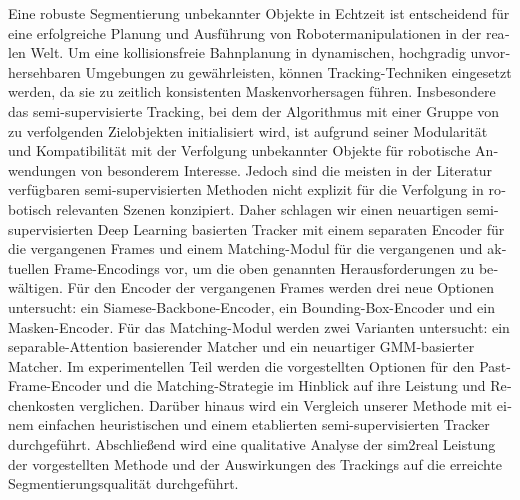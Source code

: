 \begin{otherlanguage}{ngerman} %
Eine robuste Segmentierung unbekannter Objekte in Echtzeit ist entscheidend für eine erfolgreiche Planung und Ausführung von Robotermanipulationen in der realen Welt. 
Um eine kollisionsfreie Bahnplanung in dynamischen, hochgradig unvorhersehbaren Umgebungen zu gewährleisten, können Tracking-Techniken eingesetzt werden, da sie zu zeitlich konsistenten Maskenvorhersagen führen.
Insbesondere das semi-supervisierte Tracking, bei dem der Algorithmus mit einer Gruppe von zu verfolgenden Zielobjekten initialisiert wird, ist aufgrund seiner Modularität und Kompatibilität mit der Verfolgung unbekannter Objekte für robotische Anwendungen von besonderem Interesse. 
Jedoch sind die meisten in der Literatur verfügbaren semi-supervisierten Methoden nicht explizit für die Verfolgung in robotisch relevanten Szenen konzipiert.  
Daher schlagen wir einen neuartigen semi-supervisierten Deep Learning basierten Tracker mit einem separaten Encoder für die vergangenen Frames und einem Matching-Modul für die vergangenen und aktuellen Frame-Encodings vor, um die oben genannten Herausforderungen zu bewältigen. 
Für den Encoder der vergangenen Frames werden drei neue Optionen untersucht: ein Siamese-Backbone-Encoder, ein Bounding-Box-Encoder und ein Masken-Encoder. 
Für das Matching-Modul werden zwei Varianten untersucht: ein separable-Attention basierender Matcher und ein neuartiger GMM-basierter Matcher. 
Im experimentellen Teil werden die vorgestellten Optionen für den Past-Frame-Encoder und die Matching-Strategie im Hinblick auf ihre Leistung und Rechenkosten verglichen. 
Darüber hinaus wird ein Vergleich unserer Methode mit einem einfachen heuristischen und einem etablierten semi-supervisierten Tracker durchgeführt. 
Abschließend wird eine qualitative Analyse der sim2real Leistung der vorgestellten Methode und der Auswirkungen des Trackings auf die erreichte Segmentierungsqualität durchgeführt. 




\end{otherlanguage}


\makeatletter
{}
{\renewcommand{\abstractname}{Abstract}}
{\renewcommand{\abstractname}{Kurzfassung}}
\makeatother